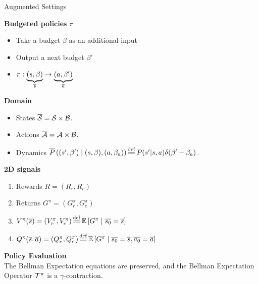 \documentclass{beamer}
\begin{document}
    \begin{frame}{Augmented Settings}

        \textbf{Budgeted policies} $\pi$
        \begin{itemize}
            \pause\item Take a budget $\beta$ as an additional input
            \pause\item Output a next budget $\beta'$
            \pause\item $ \pi:\underbrace{(s,\beta)}_{\overline{s}} \rightarrow \underbrace{(a,\beta')}_{\overline{a}}$
        \end{itemize}

        \textbf{Domain}
        \begin{itemize}
            \pause\item States $\overline{\mathcal{S}} = \mathcal{S}\times\mathcal{B}$.
            \pause\item Actions $\overline{\mathcal{A}} = \mathcal{A}\times\mathcal{B}$.
            \pause\item Dynamics $\ov{P}\left((s',\beta') \condbar (s,\beta), (a, \beta_a)\right) \eqdef P(s'|s, a)\delta(\beta' - \beta_a)$.
        \end{itemize}
        \textbf{2D signals}
        \begin{enumerate}
            \pause\item Rewards $R = (R_r, R_c)$
            \pause\item Returns $G^\pi = (G_r^\pi, G_c^\pi)$
            \pause\item $V^\pi(\os) = (V_r^\pi, V_c^\pi) \eqdef \expectedvalue\left[ G^\pi \condbar \ov{s_0} = \os\right]$
            \pause\item $Q^\pi(\os, \oa)= (Q_r^\pi, Q_c^\pi) \eqdef \expectedvalue\left[ G^\pi \condbar \ov{s_0} = \os, \ov{a_0} = \oa\right]$
        \end{enumerate}

        \pause\textbf{Policy Evaluation}\\

        The Bellman Expectation equations are preserved, and the Bellman Expectation Operator $\mathcal{T}^\pi$ is a $\gamma$-contraction.
    \end{frame}
\end{document}

